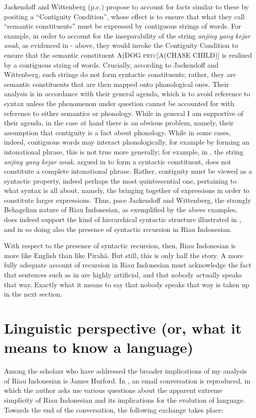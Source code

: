 \documentclass[output=paper,colorlinks,citecolor=brown
]{langscibook}
\begin{document}
Jackendoff and Wittenberg (p.c.) propose to account for facts similar to these by positing a ``Contiguity Condition'', whose effect is to ensure that what they call ``semantic constituents'' must be expressed by contiguous strings of words.  For example, in order to account for the inseparability of the string \textit{anjing yang kejar anak}, as evidenced in  -  above, they would invoke the Contiguity Condition to ensure that the semantic constituent A(DOG \textsc{prtc}[A(CHASE CHILD)] is realized by a contiguous string of words.  Crucially, according to Jackendoff and Wittenberg, such strings do not form syntactic constituents; rather, they are semantic constituents that are then mapped onto phonological ones.  Their analysis is in accordance with their general agenda, which is to avoid reference to syntax unless the phenomenon under question cannot be accounted for with reference to either semantics or phonology.  While in general I am supportive of their agenda, in the case at hand there is an obvious problem, namely, their assumption that contiguity is a fact about phonology.  While in some cases, indeed, contiguous words may interact phonologically, for example by forming an intonational phrase, this is not true more generally; for example, in , the string \textit{anjing yang kejar anak}, argued in  to form a syntactic constituent, does not constitute a complete intonational phrase.  Rather, contiguity must be viewed as a syntactic property, indeed perhaps the most quintessential one, pertaining to what syntax is all about, namely, the bringing together of expressions in order to constitute larger expressions.  Thus, pace Jackendoff and Wittenberg, the strongly Behagelian nature of Riau Indonesian, as exemplified by the above examples, does indeed support the kind of hierarchical syntactic structure illustrated in , and in so doing also the presence of syntactic recursion in Riau Indonesian.

With respect to the presence of syntactic recursion, then, Riau Indonesian is more like English than like Pirahã.  But still, this is only half the story.  A more fully adequate account of recursion in Riau Indonesian must acknowledge the fact that sentences such as in  are highly artificial, and that nobody actually speaks that way.  Exactly what it means to say that nobody speaks that way is taken up in the next section.

\section{Linguistic perspective (or, what it means to know a language)}
Among the scholars who have addressed the broader implications of my analysis of Riau Indonesian is James Hurford. In \citet[410—413]{hurford2011origins}, an email conversation is reproduced, in which the author asks me various questions about the apparent extreme simplicity of Riau Indonesian and its implications for the evolution of language.  Towards the end of the conversation, the following exchange takes place:
\end{document}
